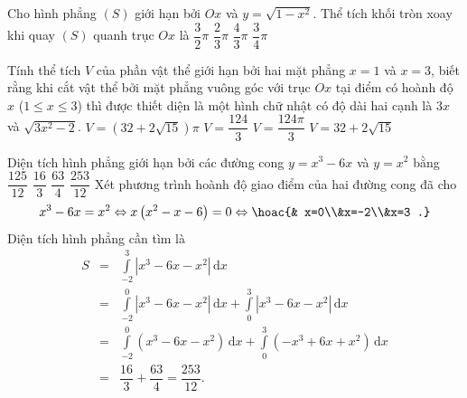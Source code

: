\begin{ex}%
	Cho hình phẳng $(S)$ giới hạn bởi $Ox$ và $y=\sqrt{1-x^2}$. Thể tích khối tròn xoay khi quay $(S)$ quanh trục $Ox$ là
	\choice
	{$\dfrac{3}{2}\pi $}
	{$\dfrac{2}{3}\pi $}
	{\True $\dfrac{4}{3}\pi $}
	{$\dfrac{3}{4}\pi $}
\end{ex}
\begin{ex}%
	Tính thể tích $V$ của phần vật thể giới hạn bởi hai mặt phẳng $x=1$ và $x=3$, biết rằng khi cắt vật thể bởi mặt phẳng vuông góc với trục $Ox$ tại điểm có hoành độ $x$ ($1\le x\le 3$) thì được thiết diện là một hình chữ nhật có độ dài hai cạnh là $3x$ và $\sqrt{3x^2-2}$.
	\choice
	{$V=(32+2\sqrt{15})\pi$}
	{\True $V=\dfrac{124}{3}$}
	{$V=\dfrac{124\pi}{3}$}
	{$V=32+2\sqrt{15}$}
\end{ex}
\begin{ex}%
	Diện tích hình phẳng giới hạn bởi các đường cong $y=x^3-6x$ và $y=x^2$ bằng
	\choice
	{$\dfrac{125}{12}$}
	{$\dfrac{16}{3}$}
	{$\dfrac{63}{4}$}
	{\True $\dfrac{253}{12}$}
	\loigiai
	{
		Xét phương trình hoành độ giao điểm của hai đường cong đã cho $$x^3-6x=x^2\Leftrightarrow x\left (x^2-x-6 \right )=0\Leftrightarrow\hoac{& x=0\\&x=-2\\&x=3 .}$$
		Diện tích hình phẳng cần tìm là
		\allowdisplaybreaks
		\begin{eqnarray*}
			S&=&\displaystyle\int\limits_{-2}^{3}\left |x^3-6x-x^2 \right |\mathrm{\,d}x\\
			&=&\displaystyle\int\limits_{-2}^{0}\left |x^3-6x-x^2 \right |\mathrm{\,d}x+\displaystyle\int\limits_{0}^{3}\left |x^3-6x-x^2 \right |\mathrm{\,d}x\\
			&=&\displaystyle\int\limits_{-2}^{0}\left(x^3-6x-x^2 \right)\mathrm{\,d}x+\displaystyle\int\limits_{0}^{3}\left(-x^3+6x+x^2 \right)\mathrm{\,d}x\\
			&=&\dfrac{16}{3}+\dfrac{63}{4}=\dfrac{253}{12}.
		\end{eqnarray*}
	}
\end{ex}
